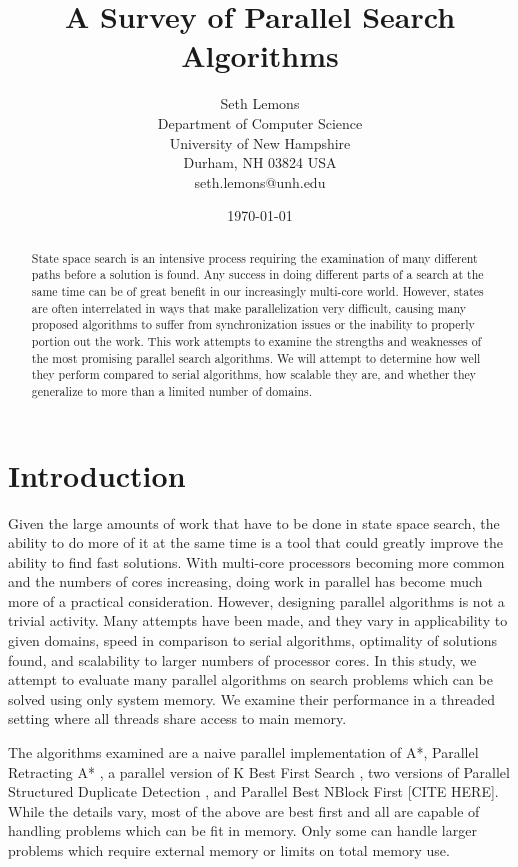 \documentclass{article}
\title{A Survey of Parallel Search Algorithms}
\author{Seth Lemons \\
Department of Computer Science \\
University of New Hampshire \\
Durham, NH 03824 USA \\
seth.lemons@unh.edu}
\date{\today}
\begin{document}
\maketitle

\begin{abstract}
State space search is an intensive process requiring the examination of many different paths before a solution is found. Any success in doing different parts of a search at the same time can be of great benefit in our increasingly multi-core world. However, states are often interrelated in ways that make parallelization very difficult, causing many proposed algorithms to suffer from synchronization issues or the inability to properly portion out the work. This work attempts to examine the strengths and weaknesses of the most promising parallel search algorithms. We will attempt to determine how well they perform compared to serial algorithms, how scalable they are, and whether they generalize to more than a limited number of domains.
\end{abstract}

\section{Introduction}
Given the large amounts of work that have to be done in state space search, the ability to do more of it at the same time is a tool that could greatly improve the ability to find fast solutions. With multi-core processors becoming more common and the numbers of cores increasing, doing work in parallel has become much more of a practical consideration. However, designing parallel algorithms is not a trivial activity. Many attempts have been made, and they vary in applicability to given domains, speed in comparison to serial algorithms, optimality of solutions found, and scalability to larger numbers of processor cores. In this study, we attempt to evaluate many parallel algorithms on search problems which can be solved using only system memory. We examine their performance in a threaded setting where all threads share access to main memory.

The algorithms examined are a naive parallel implementation of A*, Parallel Retracting A* \cite{evett:pra}, a parallel version of K Best First Search \cite{felner:kbf}, two versions of Parallel Structured Duplicate Detection \cite{zhou:psd}, and Parallel Best NBlock First [CITE HERE]. While the details vary, most of the above are best first and all are capable of handling problems which can be fit in memory. Only some can handle larger problems which require external memory or limits on total memory use.
\end{document}
